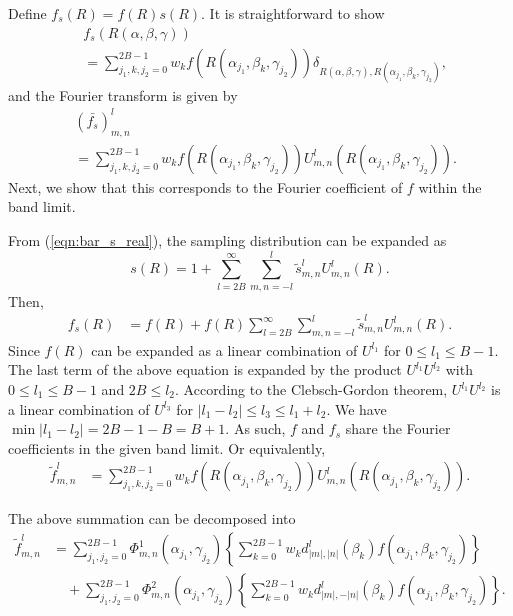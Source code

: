 \documentclass[onecolumn,11pt]{IEEEtran}
\newcommand{\refeqn}[1]{(\ref{eqn:#1})}
\begin{document}
Define $f_s(R)=f(R) s(R)$. 
It is straightforward to show
\begin{align*}
&f_s(R(\alpha,\beta,\gamma))\\
& = 
\sum_{j_1,k,j_2=0}^{2B-1} w_k f(R(\alpha_{j_1},\beta_k,\gamma_{j_2})) 
\delta_{R(\alpha,\beta,\gamma),R(\alpha_{j_1},\beta_k,\gamma_{j_2})},
\end{align*}
and the Fourier transform is given by
\begin{align*}
&(\bar{f_s})^l_{m,n}\\
& = 
\sum_{j_1,k,j_2=0}^{2B-1} w_k f(R(\alpha_{j_1},\beta_k,\gamma_{j_2})) 
{U^l_{m,n}(R(\alpha_{j_1},\beta_k,\gamma_{j_2}))}.
\end{align*}
Next, we show that this corresponds to the Fourier coefficient of $f$ within the band limit. 

From \refeqn{bar_s_real}, the sampling distribution can be expanded as
\[
s(R)=1+\sum_{l=2B}^\infty \sum_{m,n=-l}^l \tilde s^l_{m,n} U^l_{m,n}(R).
\]
Then,
\begin{align*}
    f_s(R)&=f(R)+f(R)\sum_{l=2B}^\infty \sum_{m,n=-l}^l \tilde s^l_{m,n} U^l_{m,n}(R).
\end{align*}
Since $f(R)$ can be expanded as a linear combination of $U^{l_1}$ for $0\leq l_1 \leq B-1$. 
The last term of the above equation is expanded by the product $U^{l_1}U^{l_2}$ with $0\leq l_1 \leq B-1$  and $2B\leq l_2$. 
According to the Clebsch-Gordon theorem, $U^{l_1}U^{l_2}$ is a linear combination of $U^{l_3}$ for $|l_1-l_2|\leq l_3 \leq l_1+l_2$. 
We have $\min|l_1-l_2|=2B-1-B=B+1$. 
As such, $f$ and $f_s$ share the Fourier coefficients in the given band limit. 
Or equivalently, 
\begin{align}
    \tilde f^l_{m,n}
    & = 
    \sum_{j_1,k,j_2=0}^{2B-1} w_k f(R(\alpha_{j_1},\beta_k,\gamma_{j_2})) {U^l_{m,n}(R(\alpha_{j_1},\beta_k,\gamma_{j_2}))}.
\end{align}

The above summation can be decomposed into
\begin{align*}
    \tilde f^l_{m,n} & = \sum_{j_1,j_2=0}^{2B-1} \Phi^1_{m,n}(\alpha_{j_1},\gamma_{j_2}) \left\{ \sum_{k=0}^{2B-1} w_k d^l_{|m|,|n|}(\beta_k) f(\alpha_{j_1},\beta_k,\gamma_{j_2}) \right\}\\
                     & \quad + \sum_{j_1,j_2=0}^{2B-1} \Phi^2_{m,n}(\alpha_{j_1},\gamma_{j_2}) \left\{ \sum_{k=0}^{2B-1} w_k d^l_{|m|,-|n|}(\beta_k) f(\alpha_{j_1},\beta_k,\gamma_{j_2}) \right\}.
\end{align*}
\end{document}
